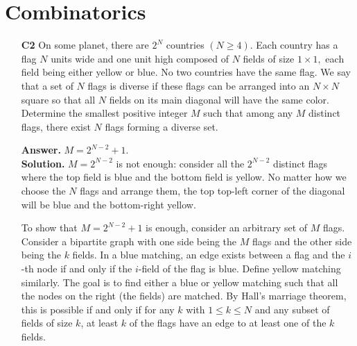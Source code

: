 \documentclass[11pt]{article}
\newcommand{\<}{\langle}
\renewcommand{\>}{\rangle}
\begin{document}
\section*{Combinatorics}
\begin{enumerate}
	\item [\textbf{C2}] On some planet, there are $2^N$ countries $(N \geq 4).$ Each country has a flag $N$ units wide and one unit high composed of $N$ fields of size $1 \times 1,$ each field being either yellow or blue. No two countries have the same flag. We say that a set of $N$ flags is diverse if these flags can be arranged into an $N \times N$ square so that all $N$ fields on its main diagonal will have the same color. Determine the smallest positive integer $M$ such that among any $M$ distinct flags, there exist $N$ flags forming a diverse set.
	
	\textbf{Answer.} $M=2^{N-2}+1$. \\
	\textbf{Solution.} $M=2^{N-2}$ is not enough: consider all the $2^{N-2}$ distinct flags where the top field is blue and the bottom field is yellow. No matter how we choose the $N$ flags and arrange them, the top top-left corner of the diagonal will be blue and the bottom-right yellow. 
	
	To show that $M=2^{N-2}+1$ is enough, consider an arbitrary set of $M$ flags. 
	Consider a bipartite graph with one side being the $M$ flags and the other side being the $k$ fields. In a blue matching, an edge exists between a flag and the $i$-th node if and only if the $i$-field of the flag is blue. Define yellow matching similarly. The goal is to find either a blue or yellow matching such that all the nodes on the right (the fields) are matched. 
	By Hall's marriage theorem, this is possible if and only if for any $k$ with $1\le k\le N$ and any subset of fields of size $k$, at least $k$ of the flags have an edge to at least one of the $k$ fields. 
	

\end{enumerate}
\end{document}
